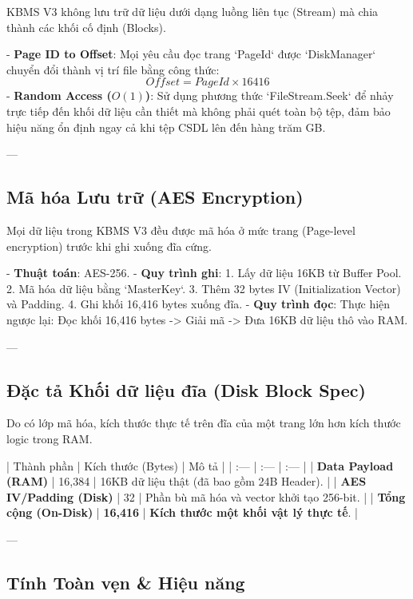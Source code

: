 KBMS V3 không lưu trữ dữ liệu dưới dạng luồng liên tục (Stream) mà chia thành các khối cố định (Blocks).

- \textbf{Page ID to Offset}: Mọi yêu cầu đọc trang `PageId` được `DiskManager` chuyển đổi thành vị trí file bằng công thức:
  \begin{equation}
Offset = PageId \times 16416
\end{equation}
- \textbf{Random Access ($O(1)$)}: Sử dụng phương thức `FileStream.Seek` để nhảy trực tiếp đến khối dữ liệu cần thiết mà không phải quét toàn bộ tệp, đảm bảo hiệu năng ổn định ngay cả khi tệp CSDL lên đến hàng trăm GB.

---

\subsection{Mã hóa Lưu trữ (AES Encryption)}

Mọi dữ liệu trong KBMS V3 đều được mã hóa ở mức trang (Page-level encryption) trước khi ghi xuống đĩa cứng.

- \textbf{Thuật toán}: AES-256.
- \textbf{Quy trình ghi}: 
    1. Lấy dữ liệu 16KB từ Buffer Pool.
    2. Mã hóa dữ liệu bằng `MasterKey`.
    3. Thêm 32 bytes IV (Initialization Vector) và Padding.
    4. Ghi khối 16,416 bytes xuống đĩa.
- \textbf{Quy trình đọc}: Thực hiện ngược lại: Đọc khối 16,416 bytes -> Giải mã -> Đưa 16KB dữ liệu thô vào RAM.

---

\subsection{Đặc tả Khối dữ liệu đĩa (Disk Block Spec)}

Do có lớp mã hóa, kích thước thực tế trên đĩa của một trang lớn hơn kích thước logic trong RAM.

| Thành phần | Kích thước (Bytes) | Mô tả |
| :--- | :--- | :--- |
| \textbf{Data Payload (RAM)} | 16,384 | 16KB dữ liệu thật (đã bao gồm 24B Header). |
| \textbf{AES IV/Padding (Disk)} | 32 | Phần bù mã hóa và vector khởi tạo 256-bit. |
| \textbf{Tổng cộng (On-Disk)} | \textbf{16,416} | \textbf{Kích thước một khối vật lý thực tế}. |

---

\subsection{Tính Toàn vẹn & Hiệu năng}

